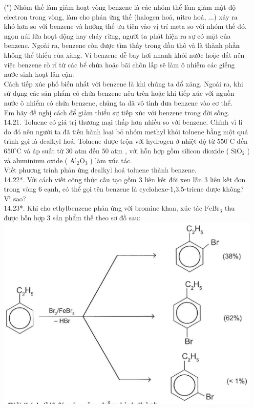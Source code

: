 \documentclass[10pt]{article}
\begin{document}
(") Nhóm thế làm giảm hoạt vòng benzene là các nhóm thể làm giảm mật độ electron trong vòng, làm cho phản ứng thế (halogen hoá, nitro hoá, ...) xảy ra khó hơn so với benzene và hướng thế ưu tiên vào vị trí meta so với nhóm thế đó.\\
ngọn núi lửa hoạt động hay cháy rừng, người ta phát hiện ra sự có mặt của benzene. Ngoài ra, benzene còn được tìm thấy trong dầu thô và là thành phần không thể thiếu của xăng. Vì benzene dễ bay hơi nhanh khỏi nước hoặc đất nên việc benzene rò rỉ từ các bể chứa hoặc bãi chôn lấp sẽ làm ô nhiễm các giếng nước sinh hoạt lân cận.\\
Cách tiếp xúc phổ biến nhất với benzene là khi chúng ta đổ xăng. Ngoài ra, khi sử dụng các sản phẩm có chứa benzene nêu trên hoặc khi tiếp xúc với nguồn nước ô nhiểm có chứa benzene, chúng ta đã vô tình đưa benzene vào cơ thể.\\
Em hãy đề nghị cách để giảm thiểu sự tiếp xúc với benzene trong đời sống.\\
14.21. Toluene có giá trị thương mại thấp hơn nhiều so với benzene. Chính vì lí do đó nên người ta đã tiến hành loại bỏ nhóm methyl khỏi toluene bằng một quá trình gọi là dealkyl hoá. Toluene được trộn với hydrogen ở nhiệt độ từ $550^{\circ} \mathrm{C}$ đến $650^{\circ} \mathrm{C}$ và áp suất từ 30 atm đến 50 atm , với hỗn hợp gồm silicon dioxide ( $\mathrm{SiO}_{2}$ ) và aluminium oxide ( $\mathrm{Al}_{2} \mathrm{O}_{3}$ ) làm xúc tác.\\
Viết phương trình phản ứng dealkyl hoá toluene thành benzene.\\
14.22*. Với cách viết công thức cấu tạo gồm 3 liên kết đôi xen lẫn 3 liên kết đơn trong vòng 6 cạnh, có thể gọi tên benzene là cyclohexe-1,3,5-triene được không? Vì sao?\\
14.23*. Khi cho ethylbenzene phản ứng với bromine khan, xúc tác $\mathrm{FeBr}_{3}$ thu được hỗn hợp 3 sản phẩm thế theo sơ đồ sau:\\
\includegraphics[max width=\textwidth, center]{2025_10_23_ae7aef68fb3b41082d29g-31}
\end{document}
